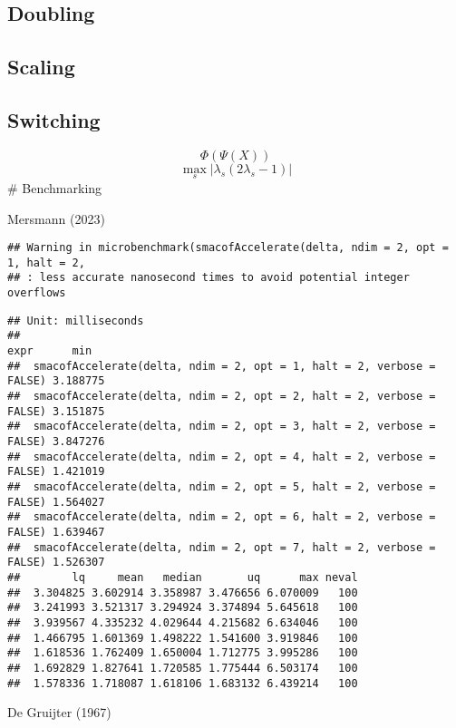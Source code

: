 \documentclass[
  12pt,
]{article}
\begin{document}
\subsection{Doubling}\label{doubling}

\subsection{Scaling}\label{scaling}

\subsection{Switching}\label{switching}

\[
\Phi(\Psi(X))
\]
\[
\max_s|\lambda_s(2\lambda_s-1)|
\]
\# Benchmarking

Mersmann (2023)

\begin{verbatim}
## Warning in microbenchmark(smacofAccelerate(delta, ndim = 2, opt = 1, halt = 2,
## : less accurate nanosecond times to avoid potential integer overflows
\end{verbatim}

\begin{verbatim}
## Unit: milliseconds
##                                                                   expr      min
##  smacofAccelerate(delta, ndim = 2, opt = 1, halt = 2, verbose = FALSE) 3.188775
##  smacofAccelerate(delta, ndim = 2, opt = 2, halt = 2, verbose = FALSE) 3.151875
##  smacofAccelerate(delta, ndim = 2, opt = 3, halt = 2, verbose = FALSE) 3.847276
##  smacofAccelerate(delta, ndim = 2, opt = 4, halt = 2, verbose = FALSE) 1.421019
##  smacofAccelerate(delta, ndim = 2, opt = 5, halt = 2, verbose = FALSE) 1.564027
##  smacofAccelerate(delta, ndim = 2, opt = 6, halt = 2, verbose = FALSE) 1.639467
##  smacofAccelerate(delta, ndim = 2, opt = 7, halt = 2, verbose = FALSE) 1.526307
##        lq     mean   median       uq      max neval
##  3.304825 3.602914 3.358987 3.476656 6.070009   100
##  3.241993 3.521317 3.294924 3.374894 5.645618   100
##  3.939567 4.335232 4.029644 4.215682 6.634046   100
##  1.466795 1.601369 1.498222 1.541600 3.919846   100
##  1.618536 1.762409 1.650004 1.712775 3.995286   100
##  1.692829 1.827641 1.720585 1.775444 6.503174   100
##  1.578336 1.718087 1.618106 1.683132 6.439214   100
\end{verbatim}

De Gruijter (1967)
\end{document}
